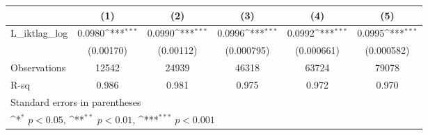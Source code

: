 {
\def\sym#1{\ifmmode^{#1}\else\(^{#1}\)\fi}
\begin{tabular}{l*{5}{c}}
\hline\hline
                &\multicolumn{1}{c}{(1)}         &\multicolumn{1}{c}{(2)}         &\multicolumn{1}{c}{(3)}         &\multicolumn{1}{c}{(4)}         &\multicolumn{1}{c}{(5)}         \\
\hline
L\_iktlag\_log    &   0.0980\sym{***}&   0.0990\sym{***}&   0.0996\sym{***}&   0.0992\sym{***}&   0.0995\sym{***}\\
                &(0.00170)         &(0.00112)         &(0.000795)         &(0.000661)         &(0.000582)         \\
\hline
Observations    &    12542         &    24939         &    46318         &    63724         &    79078         \\
R-sq            &    0.986         &    0.981         &    0.975         &    0.972         &    0.970         \\
\hline\hline
\multicolumn{6}{l}{\footnotesize Standard errors in parentheses}\\
\multicolumn{6}{l}{\footnotesize \sym{*} \(p<0.05\), \sym{**} \(p<0.01\), \sym{***} \(p<0.001\)}\\
\end{tabular}
}
